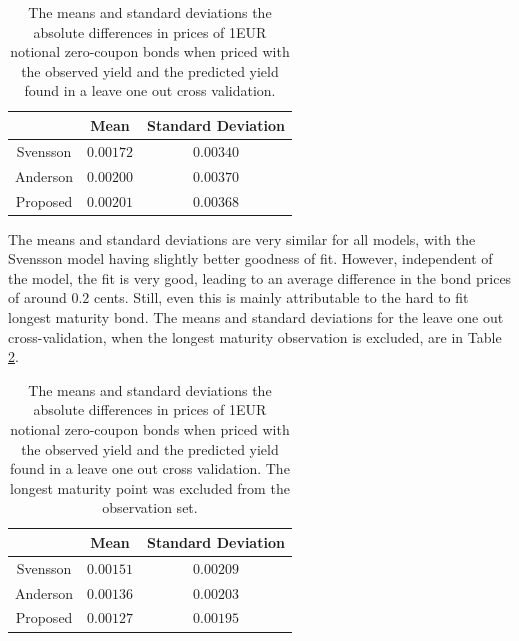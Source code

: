 \documentclass[a4paper]{artikel3}
\numberwithin{equation}{section}
\numberwithin{theorem}{section}
\numberwithin{proposition}{section}
\numberwithin{lemma}{section}
\begin{document}
\begin{table}[h!]
    \centering
    \begin{tabular}{| c | c | c |} 
    \hline
             & Mean              & Standard Deviation          \\
    \hline
    \hline
    Svensson & $0.00172$          & $0.00340$            \\
    \hline
    Anderson & $0.00200$          & $0.00370$            \\
    \hline
    Proposed & $0.00201$          & $0.00368$           \\
    \hline
    \end{tabular}
    \caption{The means and standard deviations the absolute differences in prices of 1EUR notional zero-coupon bonds when priced with the observed yield and the predicted yield found in a leave one out cross validation.}
    \label{tab:cv_all_bonds}
\end{table}

The means and standard deviations are very similar for all models, with the Svensson model having slightly better goodness of fit. However, independent of the model, the fit is very good, leading to an average difference in the bond prices of around $0.2$ cents. Still, even this is mainly attributable to the hard to fit longest maturity bond. The means and standard deviations for the leave one out cross-validation, when the longest maturity observation is excluded, are in Table \ref{tab:cv_exc_bonds}.

\begin{table}[h!]
    \centering
    \begin{tabular}{| c | c | c |} 
    \hline
             & Mean              & Standard Deviation          \\
    \hline
    \hline
    Svensson & $0.00151$          & $0.00209$            \\
    \hline
    Anderson & $0.00136$          & $0.00203$            \\
    \hline
    Proposed & $0.00127$          & $0.00195$           \\
    \hline
    \end{tabular}
    \caption{The means and standard deviations the absolute differences in prices of 1EUR notional zero-coupon bonds when priced with the observed yield and the predicted yield found in a leave one out cross validation. The longest maturity point was excluded from the observation set.}
    \label{tab:cv_exc_bonds}
\end{table}
\end{document}
